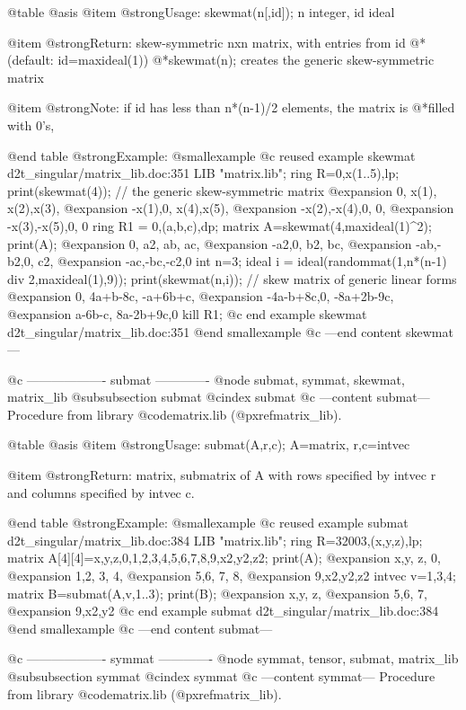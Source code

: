 @table @asis
@item @strong{Usage:}
skewmat(n[,id]); n integer, id ideal

@item @strong{Return:}
skew-symmetric nxn matrix, with entries from id
@*(default: id=maxideal(1))
@*skewmat(n); creates the generic skew-symmetric matrix

@item @strong{Note:}
if id has less than n*(n-1)/2 elements, the matrix is
@*filled with 0's,

@end table
@strong{Example:}
@smallexample
@c reused example skewmat d2t_singular/matrix_lib.doc:351 
LIB "matrix.lib";
ring R=0,x(1..5),lp;
print(skewmat(4));    // the generic skew-symmetric matrix
@expansion{} 0,    x(1), x(2),x(3),
@expansion{} -x(1),0,    x(4),x(5),
@expansion{} -x(2),-x(4),0,   0,   
@expansion{} -x(3),-x(5),0,   0    
ring R1 = 0,(a,b,c),dp;
matrix A=skewmat(4,maxideal(1)^2);
print(A);
@expansion{} 0,  a2, ab, ac,
@expansion{} -a2,0,  b2, bc,
@expansion{} -ab,-b2,0,  c2,
@expansion{} -ac,-bc,-c2,0  
int n=3;
ideal i = ideal(randommat(1,n*(n-1) div 2,maxideal(1),9));
print(skewmat(n,i));  // skew matrix of generic linear forms
@expansion{} 0,       4a+b-8c, -a+6b+c,  
@expansion{} -4a-b+8c,0,       -8a+2b-9c,
@expansion{} a-6b-c,  8a-2b+9c,0         
kill R1;
@c end example skewmat d2t_singular/matrix_lib.doc:351
@end smallexample
@c ---end content skewmat---

@c ------------------- submat -------------
@node submat, symmat, skewmat, matrix_lib
@subsubsection submat
@cindex submat
@c ---content submat---
Procedure from library @code{matrix.lib} (@pxref{matrix_lib}).

@table @asis
@item @strong{Usage:}
submat(A,r,c); A=matrix, r,c=intvec

@item @strong{Return:}
matrix, submatrix of A with rows specified by intvec r
and columns specified by intvec c.

@end table
@strong{Example:}
@smallexample
@c reused example submat d2t_singular/matrix_lib.doc:384 
LIB "matrix.lib";
ring R=32003,(x,y,z),lp;
matrix A[4][4]=x,y,z,0,1,2,3,4,5,6,7,8,9,x2,y2,z2;
print(A);
@expansion{} x,y, z, 0,
@expansion{} 1,2, 3, 4,
@expansion{} 5,6, 7, 8,
@expansion{} 9,x2,y2,z2
intvec v=1,3,4;
matrix B=submat(A,v,1..3);
print(B);
@expansion{} x,y, z,
@expansion{} 5,6, 7,
@expansion{} 9,x2,y2
@c end example submat d2t_singular/matrix_lib.doc:384
@end smallexample
@c ---end content submat---

@c ------------------- symmat -------------
@node symmat, tensor, submat, matrix_lib
@subsubsection symmat
@cindex symmat
@c ---content symmat---
Procedure from library @code{matrix.lib} (@pxref{matrix_lib}).

